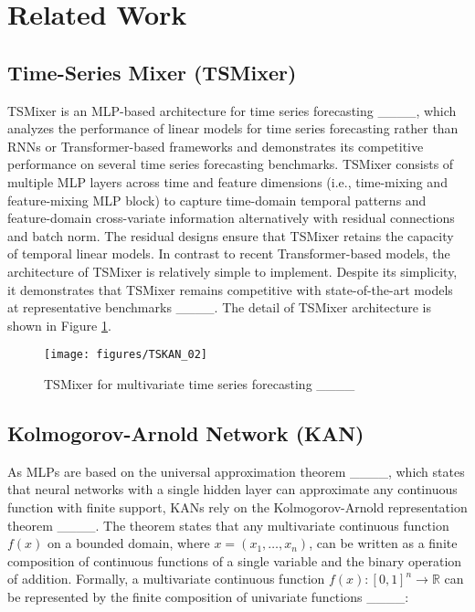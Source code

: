 \section{Related Work}
\subsection{Time-Series Mixer (TSMixer)}
TSMixer is an MLP-based architecture for time series forecasting ____, which analyzes the performance of linear models for time series forecasting rather than RNNs or Transformer-based frameworks and demonstrates its competitive performance on several time series forecasting benchmarks. TSMixer consists of multiple MLP layers across time and feature dimensions (i.e., time-mixing and feature-mixing MLP block) to capture time-domain temporal patterns and feature-domain cross-variate information alternatively with residual connections and batch norm. The residual designs ensure that TSMixer retains the capacity of temporal linear models. In contrast to recent Transformer-based models, the architecture of TSMixer is relatively simple to implement. Despite its simplicity, it demonstrates that TSMixer remains competitive with state-of-the-art models at representative benchmarks ____. The detail of TSMixer architecture is shown in Figure \ref{figure:TSMixer}.

\begin{figure}[htbp]
\centering
\texttt{[image: figures/TSKAN\_02]}
\caption{TSMixer for multivariate time series forecasting ____}
\label{figure:TSMixer}
\end{figure}

\subsection{Kolmogorov-Arnold Network (KAN)}
As MLPs are based on the universal approximation theorem ____, which states that neural networks with a single hidden layer can approximate any continuous function with finite support, KANs rely on the Kolmogorov-Arnold representation theorem ____. The theorem states that any multivariate continuous function $f(x)$ on a bounded domain, where $x=(x_{1}, \dots, x_{n})$, can be written as a finite composition of continuous functions of a single variable and the binary operation of addition. Formally, a multivariate continuous function $f(x) : [0,1]^{n} \rightarrow \mathbb{R}$ can be represented by the finite composition of univariate functions ____:

